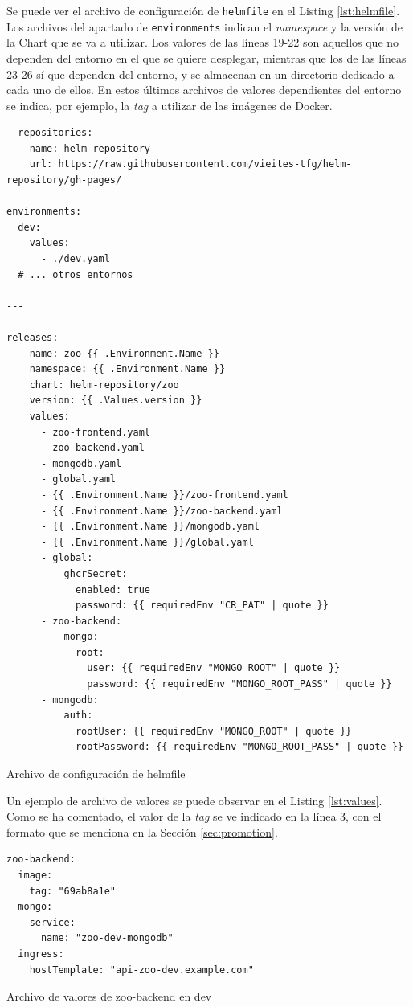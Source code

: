 Se puede ver el archivo de configuración de \texttt{helmfile} en el Listing \ref{lst:helmfile}. Los archivos del apartado de \texttt{environments} indican el \textit{namespace} y la versión de la Chart que se va a utilizar. Los valores de las líneas 19-22 son aquellos que no dependen del entorno en el que se quiere desplegar, mientras que los de las líneas 23-26 sí que dependen del entorno, y se almacenan en un directorio dedicado a cada uno de ellos. En estos últimos archivos de valores dependientes del entorno se indica, por ejemplo, la \textit{tag} a utilizar de las imágenes de Docker.

\begin{longlisting}
  \begin{verbatim}
  repositories:
  - name: helm-repository
    url: https://raw.githubusercontent.com/vieites-tfg/helm-repository/gh-pages/

environments:
  dev:
    values:
      - ./dev.yaml
  # ... otros entornos

---

releases:
  - name: zoo-{{ .Environment.Name }}
    namespace: {{ .Environment.Name }}
    chart: helm-repository/zoo
    version: {{ .Values.version }}
    values:
      - zoo-frontend.yaml
      - zoo-backend.yaml
      - mongodb.yaml
      - global.yaml
      - {{ .Environment.Name }}/zoo-frontend.yaml
      - {{ .Environment.Name }}/zoo-backend.yaml
      - {{ .Environment.Name }}/mongodb.yaml
      - {{ .Environment.Name }}/global.yaml
      - global:
          ghcrSecret:
            enabled: true
            password: {{ requiredEnv "CR_PAT" | quote }}
      - zoo-backend:
          mongo:
            root:
              user: {{ requiredEnv "MONGO_ROOT" | quote }}
              password: {{ requiredEnv "MONGO_ROOT_PASS" | quote }}
      - mongodb:
          auth:
            rootUser: {{ requiredEnv "MONGO_ROOT" | quote }}
            rootPassword: {{ requiredEnv "MONGO_ROOT_PASS" | quote }}
  \end{verbatim}
  \caption{Archivo de configuración de helmfile}
  \label{lst:helmfile}
\end{longlisting}

Un ejemplo de archivo de valores se puede observar en el Listing \ref{lst:values}. Como se ha comentado, el valor de la \textit{tag} se ve indicado en la línea 3, con el formato que se menciona en la Sección \ref{sec:promotion}.

\begin{listing}[!ht]
  \begin{verbatim}
zoo-backend:
  image:
    tag: "69ab8a1e"
  mongo:
    service:
      name: "zoo-dev-mongodb"
  ingress:
    hostTemplate: "api-zoo-dev.example.com"
  \end{verbatim}
  \caption{Archivo de valores de zoo-backend en dev}
  \label{lst:values}
\end{listing}

